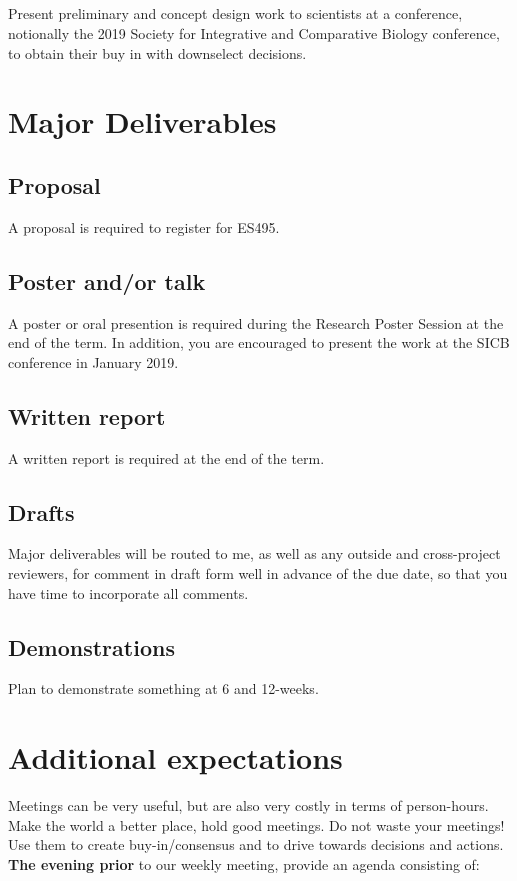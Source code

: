 \documentclass[10pt,courier]{navymemo}
\begin{document}
\subsection{} Present preliminary and concept design work to scientists at a conference, notionally the 2019 Society for Integrative and Comparative Biology conference, to obtain their buy in with downselect decisions. 

\section{Major Deliverables}
\subsection{Proposal} A proposal is required to register for ES495. 
\subsection{Poster and/or talk} A poster or oral presention is required during the Research Poster Session at the end of the term. In addition, you are encouraged to present the work at the SICB conference in January 2019. 
\subsection{Written report} A written report is required at the end of the term. 
\subsection{Drafts} Major deliverables will be routed to me, as well as any outside and cross-project reviewers, for comment in draft form well in advance of the due date, so that you have time to incorporate all comments. 
\subsection{Demonstrations} Plan to demonstrate something at 6 and 12-weeks. 

\section{Additional expectations}  Meetings can be very useful, but are also very costly in terms of person-hours.  Make the world a better place, hold good meetings.  Do not waste your meetings! Use them to create buy-in/consensus and to drive towards decisions and actions.  \textbf{The evening prior} to our weekly meeting, provide an agenda consisting of:
\end{document}
